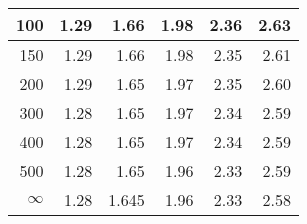 \begin{center}
\begin{tabular}{r | rrr rr}
100  &  {\normalsize  1.29} & {\normalsize  1.66} & {\normalsize  1.98} & {\normalsize  2.36} & {\normalsize  2.63}  \\ 
\hline
150  &  {\normalsize  1.29} & {\normalsize  1.66} & {\normalsize  1.98} & {\normalsize  2.35} & {\normalsize  2.61}  \\ 
200  &  {\normalsize  1.29} & {\normalsize  1.65} & {\normalsize  1.97} & {\normalsize  2.35} & {\normalsize  2.60}  \\ 
300  &  {\normalsize  1.28} & {\normalsize  1.65} & {\normalsize  1.97} & {\normalsize  2.34} & {\normalsize  2.59}  \\ 
400  &  {\normalsize  1.28} & {\normalsize  1.65} & {\normalsize  1.97} & {\normalsize  2.34} & {\normalsize  2.59}  \\ 
500  &  {\normalsize  1.28} & {\normalsize  1.65} & {\normalsize  1.96} & {\normalsize  2.33} & {\normalsize  2.59}  \\ 
\hline
\hline
$\infty$  &  {\normalsize  1.28} & {\normalsize  1.645} & {\normalsize  1.96} & {\normalsize  2.33} & {\normalsize  2.58}  \\ 
\hline
\end{tabular}
\end{center}

